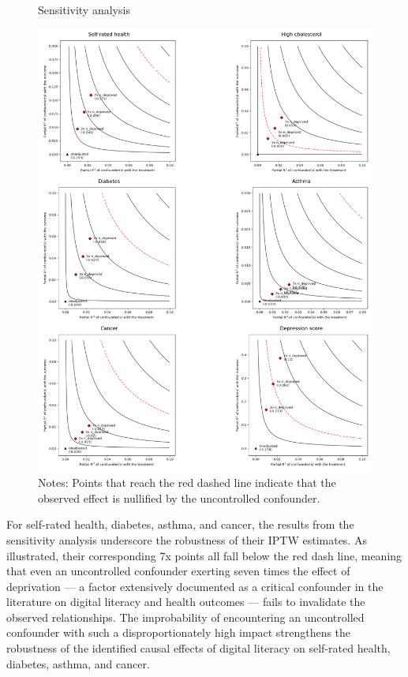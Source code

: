 \begin{figure}
    \centering
    \caption{Sensitivity analysis}
    \label{fig:sense}
    \includegraphics[width=\textwidth]{figures/sensitivity.png}
    \caption*{\footnotesize Notes: Points that reach the red dashed line indicate that the observed effect is nullified by the uncontrolled confounder.}
\end{figure}

For self-rated health, diabetes, asthma, and cancer, the results from the sensitivity analysis underscore the robustness of their IPTW estimates. As illustrated, their corresponding 7x points all fall below the red dash line, meaning that even an uncontrolled confounder exerting seven times the effect of deprivation — a factor extensively documented as a critical confounder in the literature on digital literacy and health outcomes \parencite[p. 212]{zelterman_applied_2015} — fails to invalidate the observed relationships. The improbability of encountering an uncontrolled confounder with such a disproportionately high impact strengthens the robustness of the identified causal effects of digital literacy on self-rated health, diabetes, asthma, and cancer.


